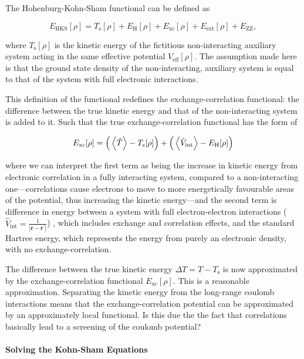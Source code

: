 \documentclass[a4paper,11pt]{article}
\numberwithin{equation}{chapter}
\numberwithin{listing}{chapter}
\begin{document}
The Hohenburg-Kohn-Sham functional can be defined as

\[
E_{\text{HKS}}[\rho] = T_{\text{s}}[\rho] + E_{\text{H}}[\rho] + E_{\text{xc}}[\rho] + E_{\text{ext}}[\rho] + E_{\text{ZZ}},
 \label{eq:hks_functional}\]

where \(T_{\text{s}}[\rho]\) is the kinetic energy of the fictitious non-interacting auxiliary system
acting in the same effective potential \(V_{\text{eff}}[\rho]\). The assumption made here is that the
ground state density of the non-interacting, auxiliary system is equal to that of the system with
full electronic interactions. 

This definition of the functional redefines the exchange-correlation functional: the difference
between the true kinetic energy and that of the non-interacting system is added to it. Such that the
true exchange-correlation functional has the form of

\[
E_{\text{xc}}[\rho] = \Big( \expval{\hat{T}} - T_{\text{s}}[\rho] \Big) + \Big( \expval{\hat{V}_{\text{int}}} - E_{\text{H}}[\rho]\Big)
\]

where we can interpret the first term as being the increase in kinetic energy from electronic
correlation in a fully interacting system, compared to a non-interacting one---correlations cause
electrons to move to more energetically favourable areas of the potential, thus increasing the
kinetic energy---and the second term is difference in energy between a system
with full electron-electron interactions (\(\hat{V}_{\text{int}} = \frac{1}{|
\mathbf{r} - \mathbf{r}^{'}|}\)) , which includes exchange and
correlation effects, and the standard Hartree energy, which
represents the energy from purely an electronic density, with no
exchange-correlation.

The difference between the true kinetic energy \(\Delta T = T - T_{\text{s}}\) is now approximated by
the exchange-correlation functional \(E_{\text{xc}}[\rho]\). This is a reasonable
approximation. Separating the kinetic energy from the long-range coulomb interactions means that the
exchange-correlation potential can be approximated by an approximately local functional. Is this due
the the fact that correlations basically lead to a screening of the coulomb potential?


\paragraph{Solving the Kohn-Sham Equations}
\label{sec:org9b70d94}
\end{document}
